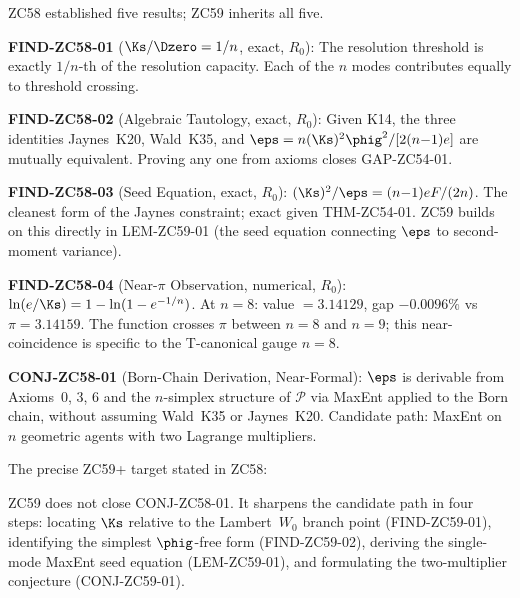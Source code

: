 \documentclass[12pt, a4paper]{article}
\begin{document}
\begin{keybox}[title={What ZC58 Left Open --- Full Atomic Inheritance}]
ZC58 established five results; ZC59 inherits all five.

\medskip
\textbf{FIND-ZC58-01} ($\Ks/\Dzero = 1/n$, exact, $R_0$):
The resolution threshold is exactly $1/n$-th of the resolution
capacity.  Each of the $n$ modes contributes equally to threshold
crossing.

\medskip
\textbf{FIND-ZC58-02} (Algebraic Tautology, exact, $R_0$):
Given K14, the three identities Jaynes~K20, Wald~K35, and
$\eps = n(\Ks)^2\phig^2/[2(n{-}1)e]$ are mutually equivalent.
Proving any one from axioms closes GAP-ZC54-01.

\medskip
\textbf{FIND-ZC58-03} (Seed Equation, exact, $R_0$):
$(\Ks)^2/\eps = (n{-}1)eF/(2n)$.
The cleanest form of the Jaynes constraint; exact given
THM-ZC54-01.  ZC59 builds on this directly in LEM-ZC59-01
(the seed equation connecting $\eps$ to second-moment variance).

\medskip
\textbf{FIND-ZC58-04} (Near-$\pi$ Observation, numerical, $R_0$):
$\ln(e/\Ks) = 1 - \ln(1-e^{-1/n})$.
At $n=8$: value $= 3.14129$, gap $-0.0096\%$ vs $\pi = 3.14159$.
The function crosses $\pi$ between $n=8$ and $n=9$; this
near-coincidence is specific to the T-canonical gauge $n=8$.

\medskip
\textbf{CONJ-ZC58-01} (Born-Chain Derivation, Near-Formal):
$\eps$ is derivable from Axioms~0, 3, 6 and the $n$-simplex
structure of $\mathcal{P}$ via MaxEnt applied to the Born chain,
without assuming Wald~K35 or Jaynes~K20.  Candidate path:
MaxEnt on $n$ geometric agents with two Lagrange multipliers.

\medskip
The precise ZC59+ target stated in ZC58:
\begin{center}
\end{center}
\end{keybox}

\medskip
ZC59 does not close CONJ-ZC58-01.  It sharpens the candidate
path in four steps: locating $\Ks$ relative to the Lambert~$W_0$
branch point (FIND-ZC59-01), identifying the simplest
$\phig$-free form (FIND-ZC59-02), deriving the single-mode
MaxEnt seed equation (LEM-ZC59-01), and formulating the
two-multiplier conjecture (CONJ-ZC59-01).

\end{document}

